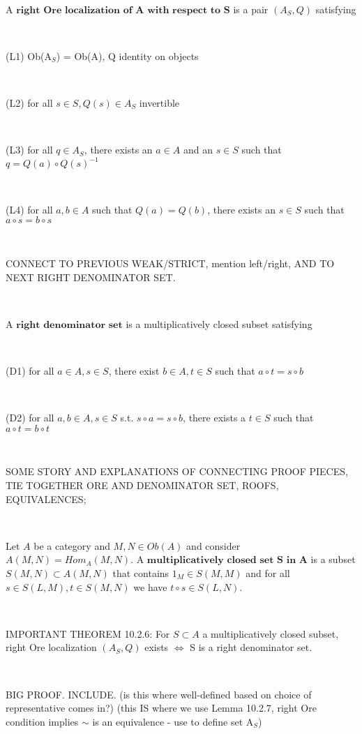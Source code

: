 \documentclass[12pt]{amsart}    %
\theoremstyle{definition}
\begin{document}
\

A $\textbf{right Ore localization of A with respect to S}$ is a pair $(A_S, Q)$ satisfying 

\

(L1) Ob(A$_S$) = Ob(A), Q identity on objects

\

(L2) for all $s \in S, Q(s) \in A_S$ invertible

\

(L3) for all $q \in A_S$, there exists an $a \in A$ and an $s \in S$ such that $q = Q(a) \circ Q(s)^{-1}$

\

(L4) for all $a, b \in A$ such that $Q(a) = Q(b)$, there exists an $s \in S$ such that $a \circ s = b \circ s$

\

CONNECT TO PREVIOUS WEAK/STRICT, mention left/right, AND TO NEXT RIGHT DENOMINATOR SET.

\

A $\textbf{right denominator set}$ is a multiplicatively closed subset satisfying

\

(D1) for all $a \in A, s \in S$, there exist  $b \in A, t \in S$ such that $a \circ t = s \circ b$

\

(D2) for all $a, b \in A, s \in S$ s.t. $s \circ a = s \circ b$, there exists a $t \in S$ such that $a \circ t = b \circ t$

\

SOME STORY AND EXPLANATIONS OF CONNECTING PROOF PIECES, TIE TOGETHER ORE AND DENOMINATOR SET, ROOFS, EQUIVALENCES; 


\

Let $A$ be a category and $M, N \in Ob(A)$ and consider $A(M,N) = Hom_A(M,N)$.  A $\textbf{multiplicatively closed set S in A}$ is a subset $S(M,N) \subset A(M,N)$ that contains $1_M \in S(M,M)$ and for all $s \in S(L,M), t \in S(M,N)$ we have $t \circ s \in S(L,N)$.  

\

IMPORTANT THEOREM 10.2.6: For $S \subset A$ a multiplicatively closed subset, right Ore localization $(A_S, Q)$ exists $\iff$ S is a right denominator set.  

\

BIG PROOF. INCLUDE. (is this where well-defined based on choice of representative comes in?) (this IS where we use Lemma 10.2.7, right Ore condition implies $\sim$ is an equivalence - use to define set A$_S$)
\end{document}
